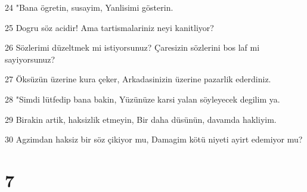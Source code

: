 \par 24 "Bana ögretin, susayim, Yanlisimi gösterin.
\par 25 Dogru söz acidir! Ama tartismalariniz neyi kanitliyor?
\par 26 Sözlerimi düzeltmek mi istiyorsunuz? Çaresizin sözlerini bos laf mi sayiyorsunuz?
\par 27 Öksüzün üzerine kura çeker, Arkadasinizin üzerine pazarlik ederdiniz.
\par 28 "Simdi lütfedip bana bakin, Yüzünüze karsi yalan söyleyecek degilim ya.
\par 29 Birakin artik, haksizlik etmeyin, Bir daha düsünün, davamda hakliyim.
\par 30 Agzimdan haksiz bir söz çikiyor mu, Damagim kötü niyeti ayirt edemiyor mu?

\chapter{7}

